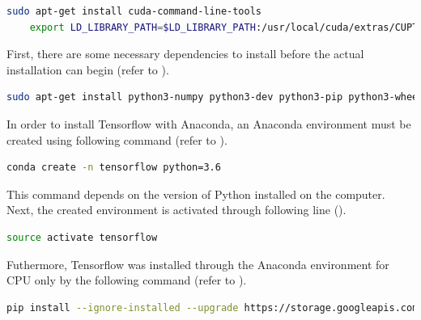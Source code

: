 \begin{minipage}{\linewidth}
\begin{lstlisting}[caption=Verification of cuDNN, label=list:libcupti, language=bash]
	sudo apt-get install cuda-command-line-tools
	export LD_LIBRARY_PATH=$LD_LIBRARY_PATH:/usr/local/cuda/extras/CUPTI/lib64
\end{lstlisting}
\end{minipage}


First, there are some necessary dependencies to install before the actual installation can begin (refer to ).

\begin{minipage}{\linewidth}
\begin{lstlisting}[caption=Installing the dependecies for Tensorflow based on Python 3.n, label=list:python_dependencies, language=bash]
	sudo apt-get install python3-numpy python3-dev python3-pip python3-wheel
\end{lstlisting}
\end{minipage}

In order to install Tensorflow with Anaconda, an Anaconda environment must be created using following command (refer to ).

\begin{minipage}{\linewidth}
\begin{lstlisting}[caption=Creating an Anaconda environment, label=list:tensorflow_anaconda, language=bash]
	conda create -n tensorflow python=3.6
\end{lstlisting}
\end{minipage}

This command depends on the version of Python installed on the computer. Next, the created environment is activated through following line ().

\begin{minipage}{\linewidth}
\begin{lstlisting}[caption=Activating the Anaconda environment, label=list:activation_anaconda, language=bash]
	source activate tensorflow
\end{lstlisting}
\end{minipage}

Futhermore, Tensorflow was installed through the Anaconda environment for CPU only by the following command (refer to ).

\begin{minipage}{\linewidth}
\begin{lstlisting}[caption=Installing Tensorflow through Anaconda, label=list:installing_tensorflow_anaconda, language=bash]
	pip install --ignore-installed --upgrade https://storage.googleapis.com/tensorflow/linux/cpu/	tensorflow-1.4.1-cp36-cp36m-linux_x86_64.whl
\end{lstlisting}
\end{minipage}

